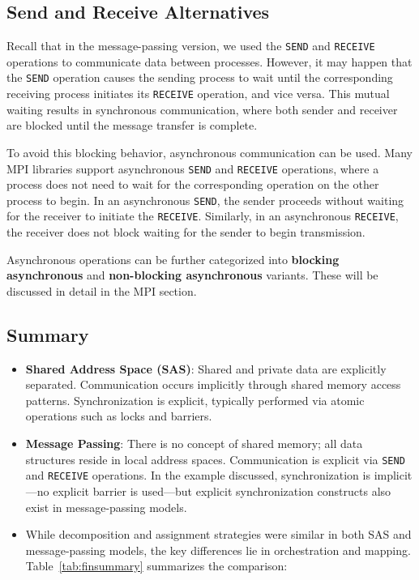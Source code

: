 \documentclass[12pt]{book}
\begin{document}
\subsection{Send and Receive Alternatives}

Recall that in the message-passing version, we used the \texttt{SEND} and \texttt{RECEIVE} operations to communicate data between processes. However, it may happen that the \texttt{SEND} operation causes the sending process to wait until the corresponding receiving process initiates its \texttt{RECEIVE} operation, and vice versa. This mutual waiting results in synchronous communication, where both sender and receiver are blocked until the message transfer is complete.

To avoid this blocking behavior, asynchronous communication can be used. Many MPI libraries support asynchronous \texttt{SEND} and \texttt{RECEIVE} operations, where a process does not need to wait for the corresponding operation on the other process to begin. In an asynchronous \texttt{SEND}, the sender proceeds without waiting for the receiver to initiate the \texttt{RECEIVE}. Similarly, in an asynchronous \texttt{RECEIVE}, the receiver does not block waiting for the sender to begin transmission.

Asynchronous operations can be further categorized into \textbf{blocking asynchronous} and \textbf{non-blocking asynchronous} variants. These will be discussed in detail in the MPI section.

\subsection{Summary}

\begin{itemize}
    \item \textbf{Shared Address Space (SAS)}: Shared and private data are explicitly separated. Communication occurs implicitly through shared memory access patterns. Synchronization is explicit, typically performed via atomic operations such as locks and barriers.
    
    \item \textbf{Message Passing}: There is no concept of shared memory; all data structures reside in local address spaces. Communication is explicit via \texttt{SEND} and \texttt{RECEIVE} operations. In the example discussed, synchronization is implicit—no explicit barrier is used—but explicit synchronization constructs also exist in message-passing models.
    
    \item While decomposition and assignment strategies were similar in both SAS and message-passing models, the key differences lie in orchestration and mapping. Table~\ref{tab:finsummary} summarizes the comparison:
\end{itemize}
\end{document}
